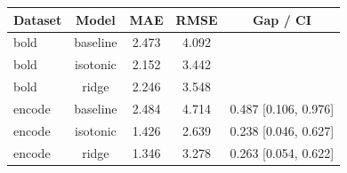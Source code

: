 \begin{tabular}{lcccc}
\toprule
Dataset & Model & MAE & RMSE & Gap / CI \\
\midrule
bold & baseline & 2.473 & 4.092 &  \\
bold & isotonic & 2.152 & 3.442 &  \\
bold & ridge & 2.246 & 3.548 &  \\
encode & baseline & 2.484 & 4.714 & 0.487 [0.106, 0.976] \\
encode & isotonic & 1.426 & 2.639 & 0.238 [0.046, 0.627] \\
encode & ridge & 1.346 & 3.278 & 0.263 [0.054, 0.622] \\
\bottomrule
\end{tabular}
